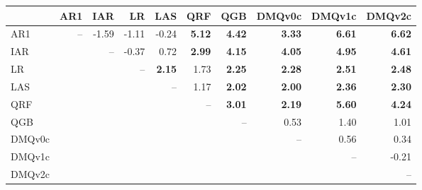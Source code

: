 \begin{tabular}{lrrrrrrrrr}
\toprule
 & AR1 & IAR & LR & LAS & QRF & QGB & DMQv0c & DMQv1c & DMQv2c \\
\midrule
AR1 & -- & -1.59 & -1.11 & -0.24 & \textbf{5.12} & \textbf{4.42} & \textbf{3.33} & \textbf{6.61} & \textbf{6.62} \\
IAR &  & -- & -0.37 & 0.72 & \textbf{2.99} & \textbf{4.15} & \textbf{4.05} & \textbf{4.95} & \textbf{4.61} \\
LR &  &  & -- & \textbf{2.15} & 1.73 & \textbf{2.25} & \textbf{2.28} & \textbf{2.51} & \textbf{2.48} \\
LAS &  &  &  & -- & 1.17 & \textbf{2.02} & \textbf{2.00} & \textbf{2.36} & \textbf{2.30} \\
QRF &  &  &  &  & -- & \textbf{3.01} & \textbf{2.19} & \textbf{5.60} & \textbf{4.24} \\
QGB &  &  &  &  &  & -- & 0.53 & 1.40 & 1.01 \\
DMQv0c &  &  &  &  &  &  & -- & 0.56 & 0.34 \\
DMQv1c &  &  &  &  &  &  &  & -- & -0.21 \\
DMQv2c &  &  &  &  &  &  &  &  & -- \\
\bottomrule
\end{tabular}
